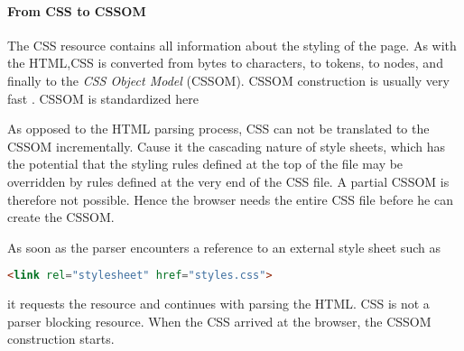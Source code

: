

\paragraph{From CSS to CSSOM}



The CSS resource contains all information about the styling of the page.
As with the HTML,CSS is converted from bytes to characters, to tokens, to nodes, and finally to the \textit{CSS Object Model} (CSSOM). %
CSSOM construction is usually very fast . %
CSSOM is standardized here %





As opposed to the HTML parsing process, CSS can not be translated to the CSSOM incrementally.
Cause it the cascading nature of style sheets, which has the potential that the styling rules defined at the top of the file may be overridden by rules defined at the very end of the CSS file.
A partial CSSOM is therefore not possible.
Hence the browser needs the entire CSS file before he can create the CSSOM.



As soon as the parser encounters a reference to an external style sheet such as

\begin{lstlisting}[language=html, numbers=none]
<link rel="stylesheet" href="styles.css">
\end{lstlisting}

it requests the resource and continues with parsing the HTML.
CSS is not a parser blocking resource.
When the CSS arrived at the browser, the CSSOM construction starts.


